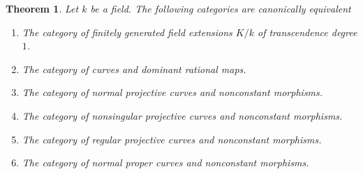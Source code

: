 \documentclass[10pt,a4paper]{amsart}
\theoremstyle{plain}
\newtheorem{theorem}[subsection]{Theorem}
\theoremstyle{definition}
\theoremstyle{remark}
\numberwithin{equation}{subsection}
\begin{document}
\begin{theorem}
\label{theorem-curves-rational-maps}
Let $k$ be a field. The following categories are canonically equivalent
\begin{enumerate}
\item The category of finitely generated field extensions $K/k$ of
transcendence degree $1$.
\item The category of curves and dominant rational maps.
\item The category of normal projective curves and nonconstant morphisms.
\item The category of nonsingular projective curves and nonconstant morphisms.
\item The category of regular projective curves and nonconstant morphisms.
\item The category of normal proper curves and nonconstant morphisms.
\end{enumerate}
\end{theorem}
\end{document}
